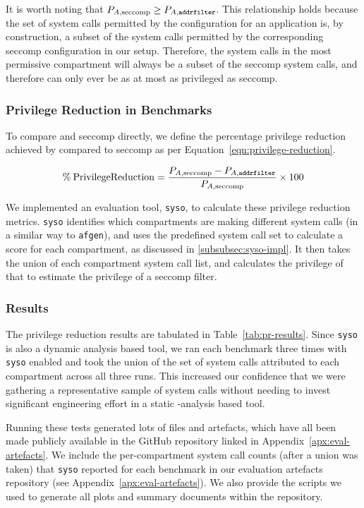 It is worth noting that $P_{A, \text{seccomp}} \ge P_{A, \texttt{addrfilter}}$. This
relationship holds because the set of system calls permitted by the \af 
configuration for an application is, by construction, a subset of the system
calls permitted by the corresponding seccomp configuration in our setup.
Therefore, the system calls in the most permissive \af compartment will always
be a subset of the seccomp system calls, and therefore \af can only ever be as at
most as privileged as seccomp.

\subsubsection{Privilege Reduction in Benchmarks}

To compare \af and seccomp directly, we define the percentage privilege
reduction achieved by \af compared to seccomp as per 
Equation~\ref{eqn:privilege-reduction}.  

\begin{equation}\label{eqn:privilege-reduction}
    \% \: \mathrm{Privilege Reduction} = 
    \frac{P_{A, \text{seccomp}} - P_{A, \text{\texttt{addrfilter}}}}{P_{A, \text{seccomp}}} 
            \times 100
\end{equation}

We implemented an evaluation tool, \texttt{syso}, to calculate these privilege
reduction metrics. \texttt{syso} identifies which compartments are making
different system calls (in a similar way to \texttt{afgen}), and uses the
predefined system call set to calculate a score for each compartment, as
discussed in \ref{subsubsec:syso-impl}. It then takes the union of each
compartment system call list, and calculates the privilege of that to
estimate the privilege of a seccomp filter.

\subsubsection{Results}

The privilege reduction results are tabulated in Table~\ref{tab:pr-results}.
Since \texttt{syso} is also a dynamic analysis based tool, we ran each
benchmark three times with \texttt{syso} enabled and took the union of the set of
system calls attributed to each compartment across all three runs. This
increased our confidence that we were gathering a representative sample of
system calls without needing to invest significant engineering effort in a static
-analysis based tool. 

Running these tests generated lots of files and artefacts, which have all been
made publicly available in the GitHub repository linked in 
Appendix~\ref{apx:eval-artefacts}. We include the per-compartment system call counts 
(after a union was taken) that \texttt{syso} reported for each benchmark in
our evaluation artefacts repository (see Appendix~\ref{apx:eval-artefacts}).
We also provide the scripts we used to generate all plots and summary documents
within the repository.

